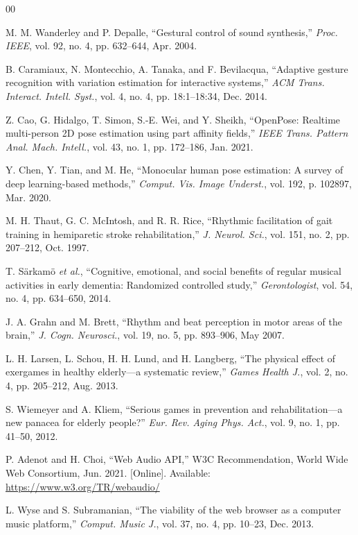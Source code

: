 \documentclass[conference]{IEEEtran}
\begin{document}
\begin{thebibliography}{00}

M. M. Wanderley and P. Depalle,
``Gestural control of sound synthesis,''
\textit{Proc. IEEE}, vol. 92, no. 4, pp. 632--644, Apr. 2004.

B. Caramiaux, N. Montecchio, A. Tanaka, and F. Bevilacqua,
``Adaptive gesture recognition with variation estimation for
interactive systems,''
\textit{ACM Trans. Interact. Intell. Syst.},
vol. 4, no. 4, pp. 18:1--18:34, Dec. 2014.

Z. Cao, G. Hidalgo, T. Simon, S.-E. Wei, and Y. Sheikh,
``OpenPose: Realtime multi-person 2D pose estimation using
part affinity fields,''
\textit{IEEE Trans. Pattern Anal. Mach. Intell.},
vol. 43, no. 1, pp. 172--186, Jan. 2021.

Y. Chen, Y. Tian, and M. He,
``Monocular human pose estimation: A survey of deep
learning-based methods,''
\textit{Comput. Vis. Image Underst.}, vol. 192,
p. 102897, Mar. 2020.

M. H. Thaut, G. C. McIntosh, and R. R. Rice,
``Rhythmic facilitation of gait training in hemiparetic stroke
rehabilitation,''
\textit{J. Neurol. Sci.}, vol. 151, no. 2,
pp. 207--212, Oct. 1997.

T. S\"{a}rkam\"{o} \textit{et al.},
``Cognitive, emotional, and social benefits of regular musical
activities in early dementia: Randomized controlled study,''
\textit{Gerontologist}, vol. 54, no. 4, pp. 634--650, 2014.

J. A. Grahn and M. Brett,
``Rhythm and beat perception in motor areas of the brain,''
\textit{J. Cogn. Neurosci.}, vol. 19, no. 5, pp. 893--906,
May 2007.

L. H. Larsen, L. Schou, H. H. Lund, and H. Langberg,
``The physical effect of exergames in healthy elderly---a
systematic review,''
\textit{Games Health J.}, vol. 2, no. 4, pp. 205--212,
Aug. 2013.

S. Wiemeyer and A. Kliem,
``Serious games in prevention and rehabilitation---a new
panacea for elderly people?''
\textit{Eur. Rev. Aging Phys. Act.}, vol. 9, no. 1,
pp. 41--50, 2012.

P. Adenot and H. Choi,
``Web Audio API,'' W3C Recommendation,
World Wide Web Consortium, Jun. 2021. [Online]. Available:
\url{https://www.w3.org/TR/webaudio/}

L. Wyse and S. Subramanian,
``The viability of the web browser as a computer music platform,''
\textit{Comput. Music J.}, vol. 37, no. 4, pp. 10--23,
Dec. 2013.

\end{thebibliography}
\end{document}

